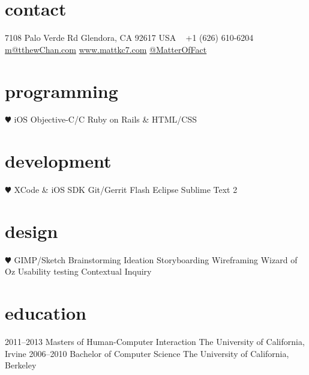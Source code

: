 \documentclass[]{friggeri-cv} %
\begin{document}


\begin{aside} %
\section{contact}
7108 Palo Verde Rd
Glendora, CA 92617
USA
~
+1 (626) 610-6204
~
\href{mailto:m@tthewChan.com}{m@tthewChan.com}
\href{http://www.mattkc7.com}{www.mattkc7.com}
\href{https://twitter.com/matteroffact}{@MatterOfFact}
\section{programming}
{\color{red} $\varheartsuit$} iOS
Objective-C/C
Ruby on Rails
\& HTML/CSS
\section{development}
{\color{red} $\varheartsuit$} XCode \& iOS SDK
Git/Gerrit
Flash
Eclipse
Sublime Text 2
\section{design}
{\color{red} $\varheartsuit$} GIMP/Sketch
Brainstorming
Ideation
Storyboarding
Wireframing
Wizard of Oz
Usability testing
Contextual Inquiry
\end{aside}



\section{education}

\begin{entrylist}
\entry
{2011--2013}
{Masters {\normalfont of Human-Computer Interaction}}
{The University of California, Irvine}
{}
\entry
{2006--2010}
{Bachelor {\normalfont of Computer Science}}
{The University of California, Berkeley}
{}
\end{entrylist}
\end{document}
